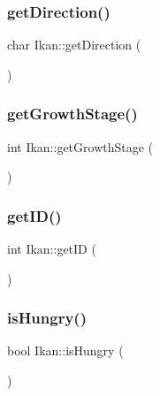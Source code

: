 \subsubsection{\texorpdfstring{get\+Direction()}{getDirection()}}
{\footnotesize\ttfamily char Ikan\+::get\+Direction (\begin{DoxyParamCaption}{ }\end{DoxyParamCaption})}

\mbox{\label{class_ikan_aa224e500b9f7c1f1e39b6045041a0d2f}} 
\subsubsection{\texorpdfstring{get\+Growth\+Stage()}{getGrowthStage()}}
{\footnotesize\ttfamily int Ikan\+::get\+Growth\+Stage (\begin{DoxyParamCaption}{ }\end{DoxyParamCaption})}

\mbox{\label{class_ikan_aa047dd2004a534353200f274e1541127}} 
\subsubsection{\texorpdfstring{get\+I\+D()}{getID()}}
{\footnotesize\ttfamily int Ikan\+::get\+ID (\begin{DoxyParamCaption}{ }\end{DoxyParamCaption})}

\mbox{\label{class_ikan_a893df179377af8174785228240eead8d}} 
\subsubsection{\texorpdfstring{is\+Hungry()}{isHungry()}}
{\footnotesize\ttfamily bool Ikan\+::is\+Hungry (\begin{DoxyParamCaption}{ }\end{DoxyParamCaption})}

\mbox{\label{class_ikan_af1b9d17721061771c7ea855b9c6e301d}} 
